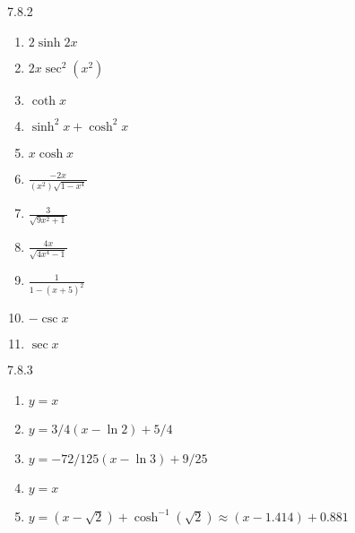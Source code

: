 \begin{Answer}{7.8.2}
	\begin{enumerate}
	\item {$2\sinh 2x$}
	\item {$2x\sec^2(x^2)$}
	\item {$\coth x$}
	\item {$\sinh^2x+\cosh^2x$}
	\item {$x\cosh x$}
	\item {$\frac{-2x}{(x^2)\sqrt{1-x^4}}$}
	\item {$\frac{3}{\sqrt{9x^2+1}}$}
	\item {$\frac{4x}{\sqrt{4x^4-1}}$}
	\item {$\frac{1}{1-(x+5)^2}$}
	\item {$-\csc x$}
	\item {$\sec x$}
	\end{enumerate}
	
\end{Answer}
\begin{Answer}{7.8.3}
	\begin{enumerate}
	\item {$y=x$}
	\item {$y=3/4(x-\ln 2)+5/4$}
	\item {$y=-72/125(x-\ln 3)+9/25$}
	\item {$y=x$}
	\item  {$y=(x-\sqrt{2})+\cosh^{-1}(\sqrt{2}) \approx (x-1.414)+0.881$}
	\end{enumerate}
	
\end{Answer}
